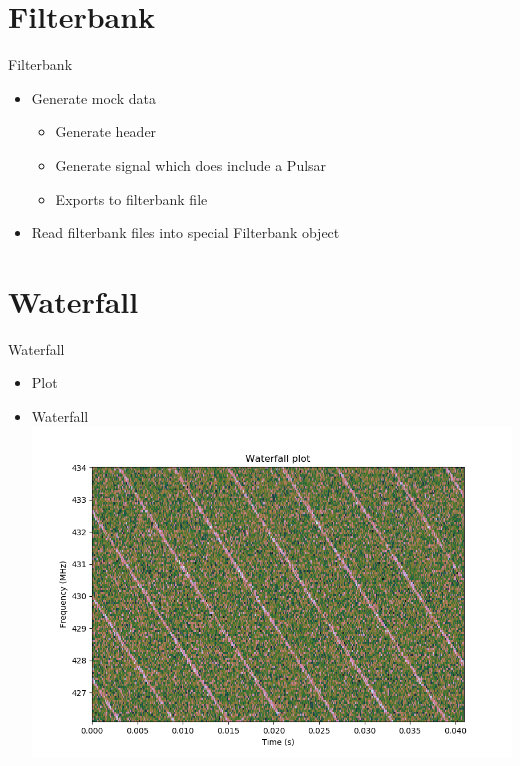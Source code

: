 \documentclass{beamer}
\begin{document}
\section{Filterbank}
\begin{frame}{Filterbank}
	\begin{itemize}
		\item Generate mock data
		\begin{itemize}
			\item Generate header
			\item Generate signal which does include a Pulsar
			\item Exports to filterbank file
		\end{itemize}
		\item Read filterbank files into special Filterbank object
	\end{itemize}
\end{frame}

\section{Waterfall}
\begin{frame}{Waterfall}
	\begin{itemize}
		\item Plot
		\item Waterfall
		\includegraphics[width=\textwidth]{waterfall_plot}
	\end{itemize}
\end{frame}
\end{document}
